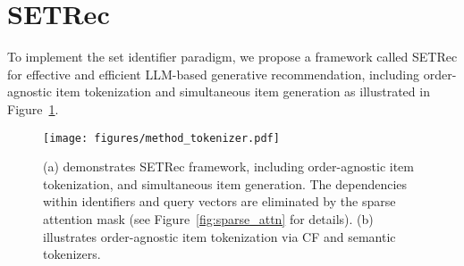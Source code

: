 \section{SETRec}\label{sec:method}
To implement the set identifier paradigm, we propose a framework called SETRec for effective and efficient LLM-based generative recommendation, including order-agnostic item tokenization and simultaneous item generation as illustrated in Figure~\ref{fig:method_tokenizer}.  


\begin{figure}[t]
\setlength{\abovecaptionskip}{0.02cm}
\setlength{\belowcaptionskip}{-0.3cm}
\centering
\texttt{[image: figures/method\_tokenizer.pdf]}
\caption{(a) demonstrates SETRec framework, including order-agnostic item tokenization, and simultaneous item generation. The dependencies within identifiers and query vectors are eliminated by the sparse attention mask (see Figure~\ref{fig:sparse_attn} for details). (b) illustrates order-agnostic item tokenization via CF and semantic tokenizers.}
\label{fig:method_tokenizer}
\end{figure}


